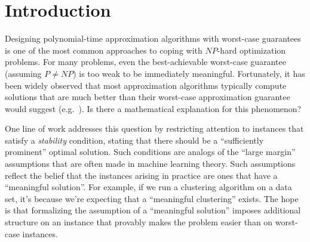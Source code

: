 \section{Introduction}\label{sec:introduction}

Designing polynomial-time approximation algorithms with worst-case
guarantees is one of the most common approaches to coping with
$NP$-hard optimization problems.  For many problems, even the
best-achievable worst-case guarantee (assuming $P \neq NP$) is too
weak to be immediately meaningful.
Fortunately, it has been widely observed that most approximation
algorithms typically compute solutions that are much better than their
worst-case approximation guarantee would suggest
(e.g.~\cite{cormode2010set,rego2011traveling}).
Is there a mathematical explanation for this phenomenon?


One line of work addresses this question by restricting attention to
instances that satisfy a {\em stability} condition, stating that there
should be a ``sufficiently prominent'' optimal solution.  
Such conditions are analogs of the ``large margin'' assumptions that are
often made in machine learning theory.
Such assumptions reflect the belief that the instances arising in
practice are ones that have a ``meaningful solution''.  For example,
if we run a clustering algorithm on a data set, it's because we're
expecting that a ``meaningful clustering'' exists.  
The hope is that
formalizing the assumption of a ``meaningful solution'' imposes
additional structure on an instance that provably makes the problem
easier than on worst-case instances.

